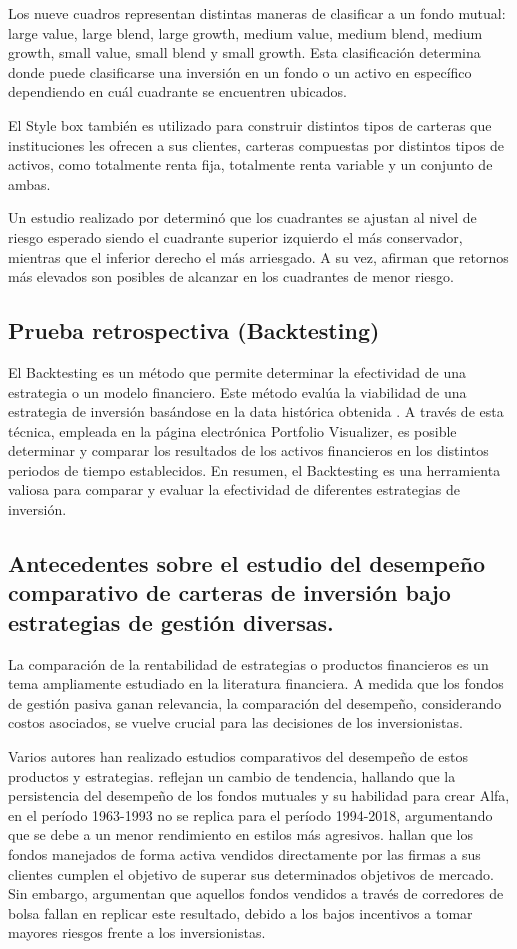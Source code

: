 \documentclass[a4paper,fleqn]{cas-sc}
\begin{document}
Los nueve cuadros representan distintas maneras de clasificar a un fondo mutual: large value, large blend, large growth, medium value, medium blend, medium growth, small value, small blend y small growth. Esta clasificación determina donde puede clasificarse una inversión en un fondo o un activo en específico dependiendo en cuál cuadrante se encuentren ubicados.

El Style box también es utilizado para construir distintos tipos de carteras que instituciones les ofrecen a sus clientes, carteras compuestas por distintos tipos de activos, como totalmente renta fija, totalmente renta variable y un conjunto de ambas.

Un estudio realizado por \cite{Schadler} determinó que los cuadrantes se ajustan al nivel de riesgo esperado siendo el cuadrante superior izquierdo el más conservador, mientras que el inferior derecho el más arriesgado. A su vez, afirman que retornos más elevados son posibles de alcanzar en los cuadrantes de menor riesgo.

\subsection{Prueba retrospectiva (Backtesting)}
El Backtesting es un método que permite determinar la efectividad de una estrategia o un modelo financiero. Este método evalúa la viabilidad de una estrategia de inversión basándose en la data histórica obtenida \cite{Yong}. A través de esta técnica, empleada en la página electrónica Portfolio Visualizer, es posible determinar y comparar los resultados de los activos financieros en los distintos periodos de tiempo establecidos. En resumen, el Backtesting es una herramienta valiosa para comparar y evaluar la efectividad de diferentes estrategias de inversión.

\subsection{Antecedentes sobre el estudio del desempeño comparativo de carteras de inversión bajo estrategias de gestión diversas.}

La comparación de la rentabilidad de estrategias o productos financieros es un tema ampliamente estudiado en la literatura financiera. A medida que los fondos de gestión pasiva ganan relevancia, la comparación del desempeño, considerando costos asociados, se vuelve crucial para las decisiones de los inversionistas.

Varios autores han realizado estudios comparativos del desempeño de estos productos y estrategias. \cite{Choi} reflejan un cambio de tendencia, hallando que la persistencia del desempeño de los fondos mutuales y su habilidad para crear Alfa, en el período 1963-1993 no se replica para el período 1994-2018, argumentando que se debe a un menor rendimiento en estilos más agresivos. \cite{Reuter} hallan que los fondos manejados de forma activa vendidos directamente por las firmas a sus clientes cumplen el objetivo de superar sus determinados objetivos de mercado. Sin embargo, argumentan que aquellos fondos vendidos a través de corredores de bolsa fallan en replicar este resultado, debido a los bajos incentivos a tomar mayores riesgos frente a los inversionistas.
\end{document}
